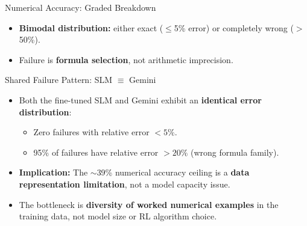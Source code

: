 \documentclass[10pt]{beamer}
\begin{document}
\begin{frame}{Numerical Accuracy: Graded Breakdown}
\begin{center}
\end{center}

\vspace{0.2cm}
\large
\begin{itemize}
    \item \textbf{Bimodal distribution:} either exact ($\leq$5\% error) or completely wrong ($>$50\%).
    \item Failure is \textbf{formula selection}, not arithmetic imprecision.
\end{itemize}
\end{frame}

\begin{frame}{Shared Failure Pattern: SLM $\equiv$ Gemini}
\large
\begin{itemize}
    \item Both the fine-tuned SLM and Gemini exhibit an \textbf{identical error distribution}:
    \vspace{0.2cm}
    \begin{itemize}
        \item Zero failures with relative error $<5\%$.
        \item 95\% of failures have relative error $>20\%$ (wrong formula family).
    \end{itemize}
    \vspace{0.3cm}

    \item \textbf{Implication:} The $\sim$39\% numerical accuracy ceiling is a \textbf{data representation limitation}, not a model capacity issue.
    \vspace{0.3cm}

    \item The bottleneck is \textbf{diversity of worked numerical examples} in the training data, not model size or RL algorithm choice.
\end{itemize}
\end{frame}
\end{document}

